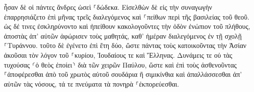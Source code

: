 \documentclass{openreader}
\begin{document}
ἦσαν δὲ οἱ πάντες ἄνδρες ὡσεὶ ⸀δώδεκα. 
Εἰσελθὼν δὲ εἰς τὴν συναγωγὴν ἐπαρρησιάζετο ἐπὶ μῆνας τρεῖς διαλεγόμενος καὶ ⸀πείθων περὶ τῆς βασιλείας τοῦ θεοῦ. 
ὡς δέ τινες ἐσκληρύνοντο καὶ ἠπείθουν κακολογοῦντες τὴν ὁδὸν ἐνώπιον τοῦ πλήθους, ἀποστὰς ἀπ’ αὐτῶν ἀφώρισεν τοὺς μαθητάς, καθ’ ἡμέραν διαλεγόμενος ἐν τῇ σχολῇ ⸀Τυράννου. 
τοῦτο δὲ ἐγένετο ἐπὶ ἔτη δύο, ὥστε πάντας τοὺς κατοικοῦντας τὴν Ἀσίαν ἀκοῦσαι τὸν λόγον τοῦ ⸀κυρίου, Ἰουδαίους τε καὶ Ἕλληνας. 
Δυνάμεις τε οὐ τὰς τυχούσας ⸂ὁ θεὸς ἐποίει⸃ διὰ τῶν χειρῶν Παύλου, 
ὥστε καὶ ἐπὶ τοὺς ἀσθενοῦντας ⸀ἀποφέρεσθαι ἀπὸ τοῦ χρωτὸς αὐτοῦ σουδάρια ἢ σιμικίνθια καὶ ἀπαλλάσσεσθαι ἀπ’ αὐτῶν τὰς νόσους, τά τε πνεύματα τὰ πονηρὰ ⸀ἐκπορεύεσθαι. 
\end{document}

